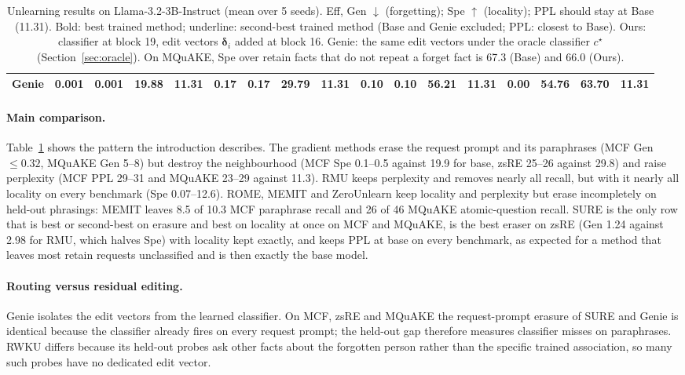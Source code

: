 \documentclass{article}
\theoremstyle{remark}
\theoremstyle{definition}
\begin{document}
\begin{table}[t]
\begin{tabular}{l cccc cccc cccc cccc}
\midrule
Genie       & 0.001 & 0.001 & 19.88 & 11.31 & 0.17 & 0.17 & 29.79 & 11.31 & 0.10 & 0.10 & 56.21 & 11.31 & 0.00 & 54.76 & 63.70 & 11.31 \\
\bottomrule
\end{tabular}
\caption{Unlearning results on Llama-3.2-3B-Instruct (mean over 5 seeds). Eff, Gen $\downarrow$ (forgetting); Spe $\uparrow$ (locality); PPL should stay at Base (11.31). Bold: best trained method; underline: second-best trained method (Base and Genie excluded; PPL: closest to Base). Ours: classifier at block 19, edit vectors $\boldsymbol\delta_i$ added at block 16. Genie: the same edit vectors under the oracle classifier $c^\star$ (Section~\ref{sec:oracle}). On MQuAKE, Spe over retain facts that do not repeat a forget fact is 67.3 (Base) and 66.0 (Ours).}
\label{tab:main}
\end{table}

\paragraph{Main comparison.}
Table~\ref{tab:main} shows the pattern the introduction describes. The gradient methods erase the request prompt and its paraphrases (MCF Gen $\le 0.32$, MQuAKE Gen 5--8) but destroy the neighbourhood (MCF Spe 0.1--0.5 against 19.9 for base, zsRE 25--26 against 29.8) and raise perplexity (MCF PPL 29--31 and MQuAKE 23--29 against 11.3). RMU keeps perplexity and removes nearly all recall, but with it nearly all locality on every benchmark (Spe 0.07--12.6). ROME, MEMIT and ZeroUnlearn keep locality and perplexity but erase incompletely on held-out phrasings: MEMIT leaves 8.5 of 10.3 MCF paraphrase recall and 26 of 46 MQuAKE atomic-question recall. SURE is the only row that is best or second-best on erasure and best on locality at once on MCF and MQuAKE, is the best eraser on zsRE (Gen 1.24 against 2.98 for RMU, which halves Spe) with locality kept exactly, and keeps PPL at base on every benchmark, as expected for a method that leaves most retain requests unclassified and is then exactly the base model.

\paragraph{Routing versus residual editing.}
Genie isolates the edit vectors from the learned classifier. On MCF, zsRE and MQuAKE the request-prompt erasure of SURE and Genie is identical because the classifier already fires on every request prompt; the held-out gap therefore measures classifier misses on paraphrases. RWKU differs because its held-out probes ask other facts about the forgotten person rather than the specific trained association, so many such probes have no dedicated edit vector.
\end{document}

